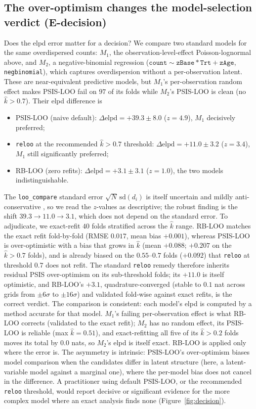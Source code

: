 \documentclass[11pt]{article}
\newcommand{\elpd}{\mathrm{elpd}}
\newcommand{\khat}{\hat{k}}
\begin{document}
\subsection{The over-optimism changes the model-selection verdict (E-decision)}\label{sec:decision}
Does the elpd error matter for a decision? We compare two standard models for the
same overdispersed counts: $M_1$, the observation-level-effect Poisson-lognormal
above, and $M_2$, a negative-binomial regression
($\texttt{count}\sim\texttt{zBase}*\texttt{Trt}+\texttt{zAge}$, \texttt{negbinomial}),
which captures overdispersion without a per-observation latent. These are
near-equivalent predictive models, but $M_1$'s per-observation random effect makes
PSIS-LOO fail on $97$ of its folds while $M_2$'s PSIS-LOO is clean (no $\khat>0.7$).
Their elpd difference is
\begin{itemize}
\item PSIS-LOO (naive default): $\Delta\elpd = +39.3\pm8.0$ ($z=4.9$), $M_1$
decisively preferred;
\item \texttt{reloo} at the recommended $\khat>0.7$ threshold:
$\Delta\elpd = +11.0\pm3.2$ ($z=3.4$), $M_1$ still significantly preferred;
\item RB-LOO (zero refits): $\Delta\elpd = +3.1\pm3.1$ ($z=1.0$), the two models
indistinguishable.
\end{itemize}
The \texttt{loo\_compare} standard error $\sqrt{N}\,\mathrm{sd}(d_i)$ is itself
uncertain and mildly anti-conservative \citep{sivula2020uncertainty}, so we read the
$z$-values as descriptive; the robust finding is the shift $39.3\to11.0\to3.1$, which
does not depend on the standard error. To adjudicate, we exact-refit $40$ folds
stratified across the $\khat$ range. RB-LOO matches the exact refit fold-by-fold
(RMSE $0.017$, mean bias $+0.001$), whereas PSIS-LOO is over-optimistic with a bias
that grows in $\khat$ (mean $+0.088$; $+0.207$ on the $\khat>0.7$ folds), and is
already biased on the $0.55$--$0.7$ folds ($+0.092$) that \texttt{reloo} at threshold
$0.7$ does not refit. The standard \texttt{reloo} remedy therefore inherits residual
PSIS over-optimism on its sub-threshold folds; its $+11.0$ is itself optimistic, and
RB-LOO's $+3.1$, quadrature-converged (stable to $0.1$ nat across grids from
$\pm6\sigma$ to $\pm16\sigma$) and validated fold-wise against exact refits, is the
correct verdict. The comparison is consistent: each model's elpd is computed by a
method accurate for that model. $M_1$'s failing per-observation effect is what RB-LOO
corrects (validated to the exact refit); $M_2$ has no random effect, its PSIS-LOO is
reliable (max $\khat=0.51$), and exact-refitting all five of its $\khat>0.2$ folds
moves its total by $0.0$ nats, so $M_2$'s elpd is itself exact. RB-LOO is applied
only where the error is. The asymmetry is intrinsic: PSIS-LOO's over-optimism biases
model comparison when the candidates differ in latent structure (here, a
latent-variable model against a marginal one), where the per-model bias does not
cancel in the difference. A practitioner using default PSIS-LOO, or the recommended
\texttt{reloo} threshold, would report decisive or significant evidence for the more
complex model where an exact analysis finds none (Figure~\ref{fig:decision}).
\end{document}
